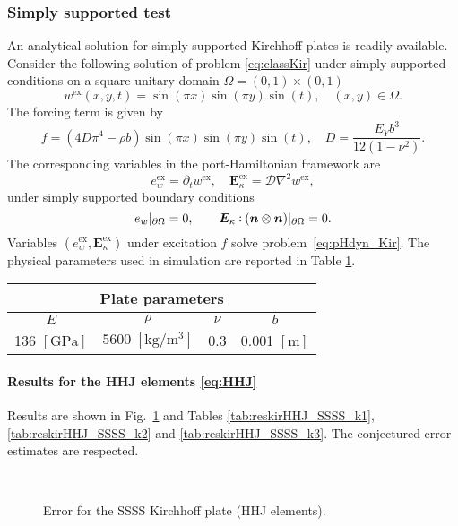 \subsubsection{Simply supported test}
An analytical solution for simply supported Kirchhoff plates is readily available. Consider the following solution of problem \eqref{eq:classKir} under simply supported conditions on a square unitary domain $\Omega = (0,1)\times (0,1)$
\[
w^{\text{ex}}(x,y,t) = \sin(\pi x) \sin(\pi y) \sin(t), \quad  (x, y) \in \Omega.
\] 
The forcing term is given by  
\[
f = (4 D \pi^4 - \rho b) \sin(\pi x) \sin(\pi y) \sin(t), \quad D = \frac{E_Y b^3}{12 (1-\nu^2)}.
\]
The corresponding variables in the port-Hamiltonian framework are
\[
e_w^{\text{ex}} = \partial_t w^{\text{ex}}, \quad \bm{E}_\kappa^{\text{ex}} = \mathcal{D} \nabla^2 w^{\text{ex}},
\]
under simply supported boundary conditions
\[
e_w\vert_{\partial\Omega} = 0, \qquad \bm{E}_\kappa \cddot (\bm{n} \otimes \bm{n})\vert_{\partial\Omega} = 0.
\]
Variables $(e_w^{\text{ex}}, \bm{E}_\kappa^{\text{ex}})$ under excitation $f$ solve problem~\eqref{eq:pHdyn_Kir}. The physical parameters used in simulation are reported in Table \ref{tab:parKir}. 

\begin{table}[htbp]
	\centering
	\begin{tabular}{cccc}
		\hline 
		\multicolumn{4}{c}{Plate parameters} \\ 
		\hline 
		$E$ & $\rho$ & $\nu$  & $b$ \\
		136 $[\textrm{GPa}]$ & $5600\; [\textrm{kg}/\textrm{m}^3]$ & 0.3 &  0.001 $[\textrm{m}]$\\ 
		\hline 
	\end{tabular} 
	\captionsetup{width=0.95\linewidth}
	\vspace{1mm}
	\label{tab:parKir}
\end{table}


\paragraph{Results for the HHJ elements \eqref{eq:HHJ}}
Results are shown in Fig.~\ref{fig:errorHHJ_SSSS} and Tables \ref{tab:reskirHHJ_SSSS_k1}, \ref{tab:reskirHHJ_SSSS_k2} and \ref{tab:reskirHHJ_SSSS_k3}. The conjectured error estimates are respected.

\begin{figure}[htbp]%
	\centering
	\hspace{8pt}%
	 \\
	\caption{Error for the SSSS Kirchhoff plate (HHJ elements).}%
	\label{fig:errorHHJ_SSSS}%
\end{figure}



